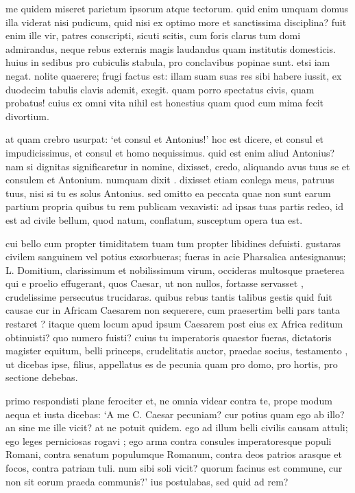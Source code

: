  me quidem miseret parietum ipsorum atque tectorum. quid enim umquam domus illa viderat nisi pudicum, quid nisi ex optimo more et sanctissima disciplina? fuit enim ille vir, patres conscripti, sicuti scitis, cum foris clarus tum domi admirandus, neque rebus externis magis laudandus quam institutis domesticis. huius in sedibus pro cubiculis stabula, pro conclavibus popinae sunt. etsi iam negat. nolite quaerere; frugi factus est: illam suam suas res sibi habere iussit, ex duodecim tabulis clavis ademit, exegit. quam porro spectatus civis, quam probatus! cuius ex omni vita nihil est honestius quam quod cum mima fecit divortium.

 at quam crebro usurpat: `et consul et Antonius!' hoc est dicere, et consul et impudicissimus, et consul et homo nequissimus. quid est enim aliud Antonius? nam si dignitas significaretur in nomine, dixisset, credo, aliquando avus tuus se et consulem et Antonium. numquam dixit . dixisset etiam conlega meus, patruus tuus, nisi si tu es solus Antonius. sed omitto ea peccata quae non sunt earum partium propria quibus tu rem publicam vexavisti: ad ipsas tuas partis redeo, id est ad civile bellum, quod natum, conflatum, susceptum opera tua est.

 cui bello cum propter timiditatem tuam tum propter libidines defuisti. gustaras civilem sanguinem vel potius exsorbueras; fueras in acie Pharsalica antesignanus; L. Domitium, clarissimum et nobilissimum virum, occideras multosque praeterea qui e proelio effugerant, quos Caesar, ut non nullos, fortasse servasset , crudelissime persecutus trucidaras. quibus rebus tantis talibus gestis quid fuit causae cur in Africam Caesarem non sequerere, cum praesertim belli pars tanta restaret ? itaque quem locum apud ipsum Caesarem post eius ex Africa reditum obtinuisti? quo numero fuisti? cuius tu imperatoris quaestor fueras, dictatoris magister equitum, belli princeps, crudelitatis auctor, praedae socius, testamento , ut dicebas ipse, filius, appellatus es de pecunia quam pro domo, pro hortis, pro sectione debebas.

 primo respondisti plane ferociter et, ne omnia videar contra te, prope modum aequa et iusta dicebas: `A me C. Caesar pecuniam? cur potius quam ego ab illo? an sine me ille vicit? at ne potuit quidem. ego ad illum belli civilis causam attuli; ego leges perniciosas rogavi ; ego arma contra consules imperatoresque populi Romani, contra senatum populumque Romanum, contra deos patrios arasque et focos, contra patriam tuli. num sibi soli vicit? quorum facinus est commune, cur non sit eorum praeda communis?' ius postulabas, sed quid ad rem?

